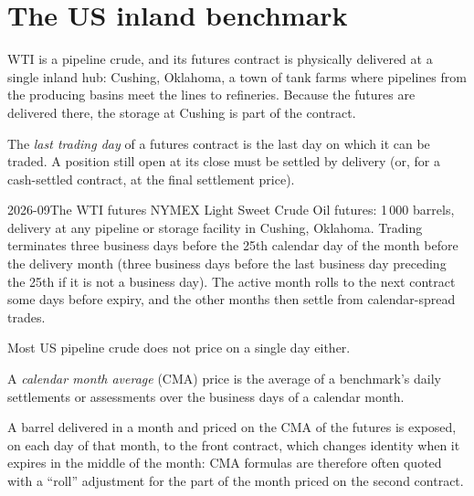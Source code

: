 \section{The US inland benchmark}

WTI is a pipeline crude, and its futures contract is physically delivered at a
single inland hub: Cushing, Oklahoma, a town of tank farms where pipelines from the
producing basins meet the lines to refineries. Because the futures are delivered
there, the storage at Cushing is part of the contract.

\begin{definition}\label{def:m3:crude-oil:ltd}
The \emph{last trading day} of a futures contract is the
last day on which it can be traded. A position still open at its close must be
settled by delivery (or, for a cash-settled contract, at the final settlement
price).
\end{definition}

\begin{dated}{2026-09}{The WTI futures}\label{dat:m3:crude-oil:cl}
NYMEX Light Sweet Crude Oil futures: 1\,000 barrels, delivery  at any
pipeline or storage facility in Cushing, Oklahoma. Trading terminates three business
days before the 25th calendar day of the month before the delivery month (three
business days before the last business day preceding the 25th if it is not a business
day). The active month rolls to the next contract some days before expiry, and the
other months then settle from calendar-spread trades.
\end{dated}

Most US pipeline crude does not price on a single day either.

\begin{definition}\label{def:m3:crude-oil:cma}
A \emph{calendar month average} (CMA) price is the
average of a benchmark's daily settlements or assessments over the business days of
a calendar month.
\end{definition}

A barrel delivered in a month and priced on the CMA of the futures is exposed, on
each day of that month, to the front contract, which changes identity when it
expires in the middle of the month: CMA formulas are therefore often quoted with a
``roll'' adjustment for the part of the month priced on the second contract.

